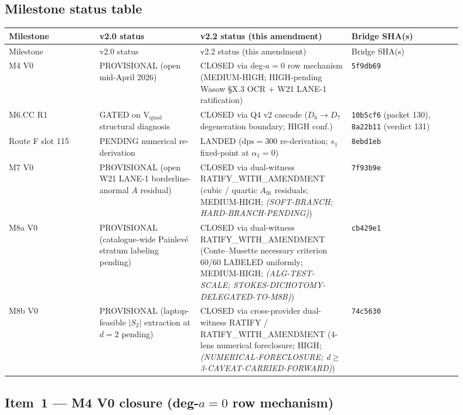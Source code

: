 \documentclass[11pt,a4paper]{article}
\theoremstyle{definition}
\theoremstyle{remark}
\begin{document}
\subsection{Milestone status table}
\label{sec:closure-cascade-table}

\begin{center}
\renewcommand{\arraystretch}{1.20}
\begin{longtable}{@{}p{0.18\linewidth} p{0.20\linewidth} p{0.30\linewidth} p{0.22\linewidth}@{}}
\toprule
Milestone & v2.0 status & v2.2 status (this amendment) & Bridge SHA(s) \\
\midrule
\endfirsthead
\toprule
Milestone & v2.0 status & v2.2 status (this amendment) & Bridge SHA(s) \\
\midrule
\endhead
M4 V0 & PROVISIONAL (open mid-April 2026) & CLOSED via deg-$a=0$ row mechanism (MEDIUM-HIGH; HIGH-pending Wasow \S X.3 OCR + W21 LANE-1 ratification) & \texttt{5f9db69} \\
M6.CC R1 & GATED on V$_{\mathrm{quad}}$ structural diagnosis & CLOSED via Q4 v2 cascade ($D_6 \to D_7$ degeneration boundary; HIGH conf.) & \texttt{10b5cf6} (packet 130), \texttt{8a22b11} (verdict 131) \\
Route F slot 115 & PENDING numerical re-derivation & LANDED ($\mathrm{dps}=300$ re-derivation; $s_1$ fixed-point at $\alpha_1=0$) & \texttt{8ebd1eb} \\
M7 V0 & PROVISIONAL (open W21 LANE-1 borderline-anormal $A$ residual) & CLOSED via dual-witness RATIFY\_WITH\_AMENDMENT (cubic / quartic $A_{\mathrm{fit}}$ residuals; MEDIUM-HIGH; \emph{(SOFT-BRANCH; HARD-BRANCH-PENDING)}) & \texttt{7f93b9e} \\
M8a V0 & PROVISIONAL (catalogue-wide Painlev\'e stratum labeling pending) & CLOSED via dual-witness RATIFY\_WITH\_AMENDMENT (Conte--Musette necessary criterion 60/60 LABELED uniformly; MEDIUM-HIGH; \emph{(ALG-TEST-SCALE; STOKES-DICHOTOMY-DELEGATED-TO-M8B)}) & \texttt{cb429e1} \\
M8b V0 & PROVISIONAL (laptop-feasible $|S_2|$ extraction at $d=2$ pending) & CLOSED via cross-provider dual-witness RATIFY / RATIFY\_WITH\_AMENDMENT (4-lens numerical foreclosure; HIGH; \emph{(NUMERICAL-FORECLOSURE; d$\geq$3-CAVEAT-CARRIED-FORWARD)}) & \texttt{74c5630} \\
\bottomrule
\end{longtable}
\end{center}

\subsection{Item~1 --- M4 V0 closure (deg-$a=0$ row mechanism)}
\label{sec:closure-cascade-m4}
\end{document}
